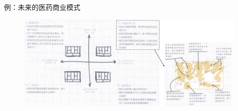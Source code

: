 例：未来的医药商业模式
\begin{figure}[H]
	\centering
	\vspace{-0.5em}
	\includegraphics[width=\textwidth]{img/未来的医药商业模式.png}
    \vspace{-0.5em}
\end{figure}


